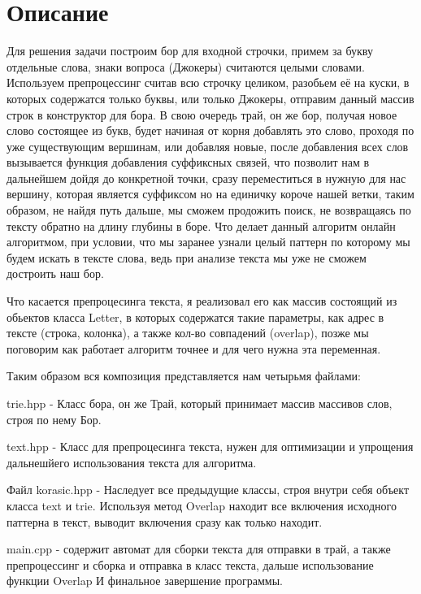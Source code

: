 \section{Описание}

Для решения задачи построим бор для входной строчки, примем за букву отдельные слова, знаки вопроса (Джокеры) считаются целыми словами. Используем препроцессинг считав всю строчку целиком, разобьем её на куски, в которых содержатся только буквы, или только Джокеры, отправим данный массив строк в конструктор для бора. В свою очередь трай, он же бор, получая новое слово состоящее из букв, будет начиная от корня добавлять это слово, проходя по уже существующим вершинам, или добавляя новые, после добавления всех слов вызывается функция добавления суффиксных связей, что позволит нам в дальнейшем дойдя до конкретной точки, сразу переместиться в нужную для нас вершину, которая является суффиксом но на единичку короче нашей ветки, таким образом, не найдя путь дальше, мы сможем продожить поиск, не возвращаясь по тексту обратно на длину глубины в боре. Что делает данный алгоритм онлайн алгоритмом, при условии, что мы заранее узнали целый паттерн по которому мы будем искать в тексте слова, ведь при анализе текста мы уже не сможем достроить наш бор.

Что касается препроцесинга текста, я реализовал его как массив состоящий из обьектов класса Letter, в которых содержатся такие параметры, как адрес в тексте (строка, колонка), а также кол-во совпадений (overlap), позже мы поговорим как работает алгоритм точнее и для чего нужна эта переменная.

Таким образом вся композиция представляется нам четырьмя файлами:

trie.hpp - Класс бора, он же Трай, который принимает массив массивов слов, строя по нему Бор.

text.hpp - Класс для препроцесинга текста, нужен для оптимизации и упрощения дальнешйего использования текста для алгоритма.

Файл korasic.hpp - Наследует все предыдущие классы, строя внутри себя объект класса text и trie. Используя метод Overlap находит все включения исходного паттерна в текст, выводит включения сразу как только находит.

main.cpp - содержит автомат для сборки текста для отправки в трай, а также препроцессинг и сборка и отправка в класс текста, дальше использование функции Overlap И финальное завершение программы.


\pagebreak


